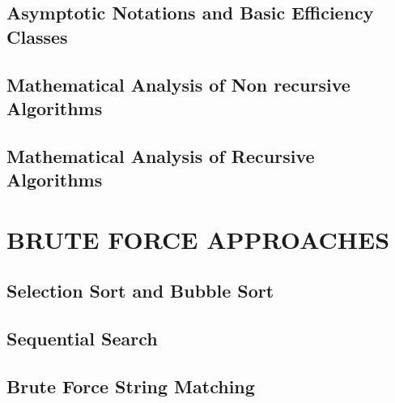 \documentclass{article}
\begin{document}
	\subsection{Asymptotic Notations and Basic Efficiency Classes}
	\subsection{Mathematical Analysis of Non recursive Algorithms}
	\subsection{Mathematical Analysis of Recursive Algorithms}

	\section{BRUTE FORCE APPROACHES}
	\subsection{Selection Sort and Bubble Sort}
	\subsection{Sequential Search}
	\subsection{Brute Force String Matching}
\end{document}
